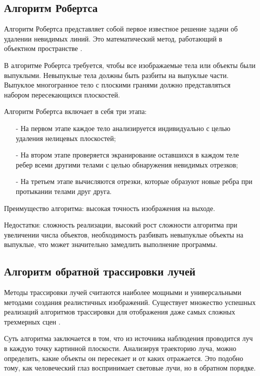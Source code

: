 \subsection{Алгоритм Робертса}

Алгоритм Робертса представляет собой первое известное решение задачи об удалении невидимых линий. Это математический метод, работающий в объектном пространстве \cite{b2}.

В алгоритме Робертса требуется, чтобы все изображаемые тела или объекты были выпуклыми. Невыпуклые тела должны быть разбиты на выпуклые части. Выпуклое многогранное тело с плоскими гранями должно представляться набором пересекающихся плоскостей.

Алгоритм Робертса включает в себя три этапа:
\begin{itemize}[label=\arabic*)]
	\item[-] На первом этапе каждое тело анализируется индивидуально с целью удаления нелицевых плоскостей;
	\item[-] На втором этапе проверяется экранирование оставшихся в каждом теле ребер всеми другими телами с целью обнаружения невидимых отрезков;
	\item[-] На третьем этапе вычисляются отрезки, которые образуют новые ребра при протыкании телами друг друга.
\end{itemize}

Преимущество алгоритма: высокая точность изображения на выходе.

Недостатки: сложность реализации, высокий рост сложности алгоритма при увеличении числа объектов, необходимость разбивать невыпуклые объекты на выпуклые, что может значительно замедлить выполнение программы.

\subsection{Алгоритм обратной трассировки лучей}

Методы трассировки лучей считаются наиболее мощными и универсальными методами создания реалистичных изображений. Существует множество успешных реализаций алгоритмов трассировки для отображения даже самых сложных трехмерных сцен \cite{b2} \cite{b3}.

Суть алгоритма заключается в том, что из источника наблюдения проводится луч в каждую точку картинной плоскости. Анализируя траекторию луча, можно определить, какие объекты он пересекает и от каких отражается. Это подобно тому, как человеческий глаз воспринимает световые лучи, но в обратном порядке.

